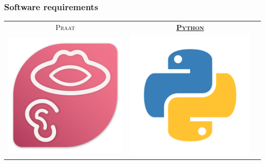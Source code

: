 \documentclass[12pt,a4paper]{beamer}
\begin{document}
\begin{frame}
    \frametitle{Software requirements}
    \centering
    \begin{tabular}{ccc}
        \textsc{Praat} & \href{https://www.python.org/}{\textbf{\textsc{Python}}} & \hspace{2cm} \\
        \includegraphics[scale=0.75]{../pictures/Praat_logo.png} & 
        \includegraphics[scale=0.75]{../pictures/Python_logo.png} &
        \\
    \end{tabular}
\end{frame}
\end{document}
